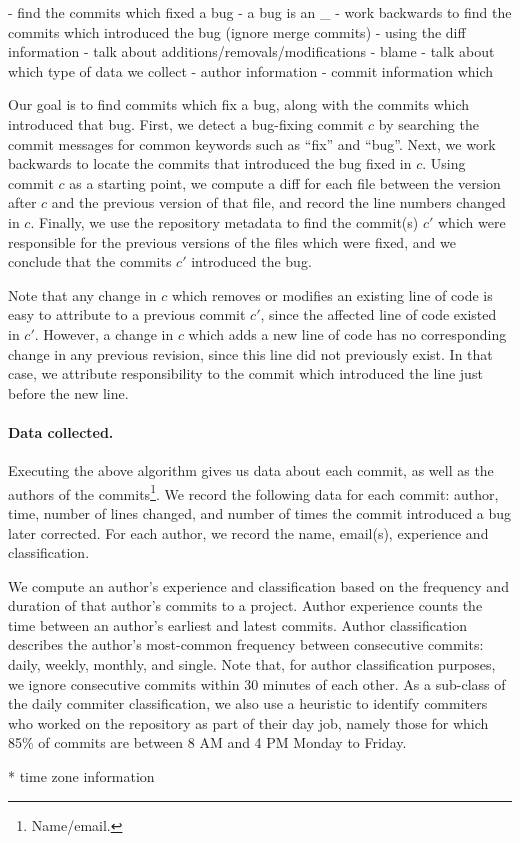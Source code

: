 - find the commits which fixed a bug
- a bug is an _
- work backwards to find the commits which introduced the bug (ignore merge commits)
 - using the diff information
 - talk about additions/removals/modifications
 - blame
- talk about which type of data we collect
 - author information
 - commit information which

Our goal is to find commits which fix a bug, along with the commits
which introduced that bug. First, we detect a bug-fixing commit $c$ by
searching the commit messages for common keywords such as ``fix'' and
``bug''. Next, we work backwards to locate the commits that introduced
the bug fixed in $c$. Using commit $c$ as a starting point, we compute
a diff for each file between the version after $c$ and the previous
version of that file, and record the line numbers changed in
$c$. Finally, we use the repository metadata to find the commit(s)
$c'$ which were responsible for the previous versions of the files
which were fixed, and we conclude that the commits $c'$ introduced the
bug.

Note that any change in $c$ which removes or modifies an existing line
of code is easy to attribute to a previous commit $c'$, since the
affected line of code existed in $c'$. However, a change in $c$ which
adds a new line of code has no corresponding change in any previous
revision, since this line did not previously exist. In that case, we
attribute responsibility to the commit which introduced the line just
before the new line.

\paragraph{Data collected.}
Executing the above algorithm gives us data about each commit, as well
as the authors of the commits\footnote{Name/email.}.  We record the
following data for each commit: author, time, number of lines changed,
and number of times the commit introduced a bug later corrected. For
each author, we record the name, email(s), experience and
classification.

We compute an author's experience and classification based on the
frequency and duration of that author's commits to a project. Author
experience counts the time between an author's earliest and latest
commits. Author classification describes the author's most-common
frequency between consecutive commits: daily, weekly, monthly, and
single. Note that, for author classification purposes, we ignore
consecutive commits within 30 minutes of each other. As a sub-class of
the daily commiter classification, we also use a heuristic to identify
commiters who worked on the repository as part of their day job,
namely those for which 85\% of commits are between 8 AM and 4 PM
Monday to Friday.


* time zone information
